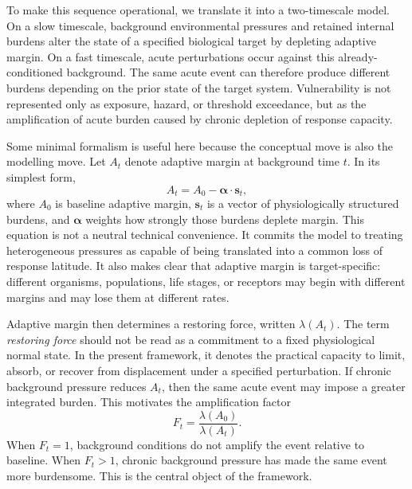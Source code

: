 To make this sequence operational, we translate it into a two-timescale model. On a slow timescale, background environmental pressures and retained internal burdens alter the state of a specified biological target by depleting adaptive margin. On a fast timescale, acute perturbations occur against this already-conditioned background. The same acute event can therefore produce different burdens depending on the prior state of the target system. Vulnerability is not represented only as exposure, hazard, or threshold exceedance, but as the amplification of acute burden caused by chronic depletion of response capacity.

Some minimal formalism is useful here because the conceptual move is also the modelling move. Let $A_t$ denote adaptive margin at background time $t$. In its simplest form,
\begin{equation}
  A_t = A_0 - \bm{\alpha}\cdot \mathbf{s}_t,
  \label{eq:intro_adaptive_margin}
\end{equation}
where $A_0$ is baseline adaptive margin, $\mathbf{s}_t$ is a vector of physiologically structured burdens, and $\bm{\alpha}$ weights how strongly those burdens deplete margin. This equation is not a neutral technical convenience. It commits the model to treating heterogeneous pressures as capable of being translated into a common loss of response latitude. It also makes clear that adaptive margin is target-specific: different organisms, populations, life stages, or receptors may begin with different margins and may lose them at different rates.

Adaptive margin then determines a restoring force, written $\lambda(A_t)$. The term \emph{restoring force} should not be read as a commitment to a fixed physiological normal state. In the present framework, it denotes the practical capacity to limit, absorb, or recover from displacement under a specified perturbation. If chronic background pressure reduces $A_t$, then the same acute event may impose a greater integrated burden. This motivates the amplification factor
\begin{equation}
  F_t = \frac{\lambda(A_0)}{\lambda(A_t)}.
  \label{eq:intro_amplification}
\end{equation}
When $F_t=1$, background conditions do not amplify the event relative to baseline. When $F_t>1$, chronic background pressure has made the same event more burdensome. This is the central object of the framework.

